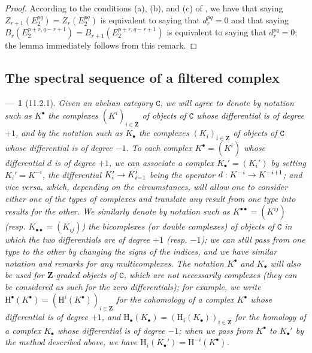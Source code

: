 \documentclass[oneside]{amsart}
\theoremstyle{ega-env-style}
\newtheorem*{env}{---}
\theoremstyle{ega-thm-env-style}
\theoremstyle{ega-defn-env-style}
\def\bb{\mathbf}                    %
\def\cat{\mathtt}                   %
\def\HH{\mathrm{H}}                 %
\renewcommand{\to}{\mathchoice{\longrightarrow}{\rightarrow}{\rightarrow}{\rightarrow}}
\newcommand{\oldpage}[2][]{{\marginnote{\normalfont{\textbf{#1}~|~#2}}}\ignorespaces}
\let\EGAOriginalLabel\label
\renewcommand{\label}[1]{\phantomsection\EGAOriginalLabel{#1}}
\begin{document}
\begin{proof}
\oldpage[0\textsubscript{III}]{27}
According to the conditions (a), (b), and (c) of , we have that saying $Z_{r+1}(E_2^{pq})=Z_r(E_2^{pq})$ is equivalent to saying that $d_r^{pq}=0$ and that saying $B_r(E_2^{p+r,q-r+1})=B_{r+1}(E_2^{p+r,q-r+1})$ is equivalent to saying that $d_r^{pq}=0$; the lemma immediately follows from this remark.
\end{proof}

\subsection{The spectral sequence of a filtered complex}
\label{subsection:0.11.2}

\begin{env}[11.2.1]
\label{0.11.2.1}
Given an abelian category $\cat{C}$, we will agree to denote by notation such as $K^\bullet$ the \emph{complexes $(K^i)_{i\in\bb{Z}}$} of objects of $\cat{C}$ whose differential is of degree $+1$, and by the notation such as $K_\bullet$ the complexes $(K_i)_{i\in\bb{Z}}$ of objects of $\cat{C}$ whose differential is of degree $-1$.
To each complex $K^\bullet=(K^i)$ whose differential $d$ is of degree $+1$, we can associate a complex $K_\bullet'=(K_i')$ by setting $K_i'=K^{-i}$, the differential $K_i'\to K_{i-1}'$ being the operator $d:K^{-i}\to K^{-i+1}$; and \emph{vice versa}, which, depending on the circumstances, will allow one to consider either one of the types of complexes and translate any result from one type into results for the other.
We similarly denote by notation such as $K^{\bullet\bullet}=(K^{ij})$ (resp. $K_{\bullet\bullet}=(K_{ij})$) the \emph{bicomplexes} (or \emph{double complexes}) of objects of $\cat{C}$ in which the \emph{two} differentials are of degree $+1$ (resp. $-1$); we can still pass from one type to the other by changing the signs of the indices, and we have similar notation and remarks for any multicomplexes.
The notation $K^\bullet$ and $K_\bullet$ will also be used for \emph{$\bb{Z}$-graded objects} of $\cat{C}$, which are not necessarily complexes (they can be considered as such for the \emph{zero} differentials); for example, we write $\HH^\bullet(K^\bullet)=(\HH^i(K^\bullet))_{i\in\bb{Z}}$ for the \emph{cohomology} of a complex $K^\bullet$ whose differential is of degree $+1$, and $\HH_\bullet(K_\bullet)=(\HH_i(K_\bullet))_{i\in\bb{Z}}$ for the \emph{homology} of a complex $K_\bullet$ whose differential is of degree $-1$; when we pass from $K^\bullet$ to $K_\bullet'$ by the method described above, we have $\HH_i(K_\bullet')=\HH^{-i}(K^\bullet)$.


\end{env}
\end{document}
